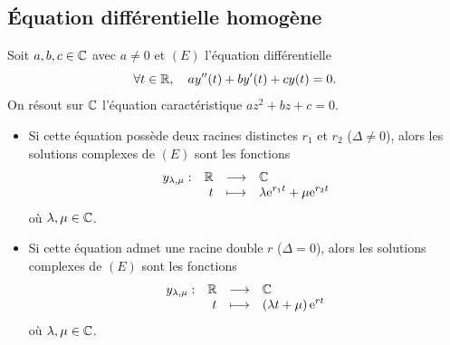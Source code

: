 \documentclass{magnolia}
\begin{document}
\subsection{Équation différentielle homogène}

\begin{proposition}[utile=-3]
Soit $a,b,c\in\mathbb{C}$ avec $a\neq 0$ et $(E)$ l'équation différentielle
\[\forall t\in\mathbb{R} ,\quad a y''(t)+by'(t)+cy(t)=0.\]
On résout sur $\mathbb{C}$ l'équation caractéristique $az^2+bz+c=0$.
\begin{itemize}
\item Si cette équation possède deux racines distinctes $r_1$ et $r_2$
  ($\Delta\neq 0$), alors les solutions complexes de $(E)$ sont les fonctions
  \[\begin{array}[t]{lrcl} \displaystyle{y_{\lambda,\mu}} : & \displaystyle{\mathbb{R}} & \longrightarrow & \displaystyle{\mathbb{C}} \\ & \displaystyle{t} & \longmapsto & \displaystyle{\lambda {\rm e}^{r_1 t}+\mu {\rm e}^{r_2 t}} \end{array}\]
  où $\lambda,\mu\in\mathbb{C}$.
\item Si cette équation admet une racine double $r$ ($\Delta=0$), alors les
  solutions complexes de $(E)$ sont les fonctions
  \[\begin{array}[t]{lrcl} \displaystyle{y_{\lambda,\mu}} : & \displaystyle{\mathbb{R}} & \longrightarrow & \displaystyle{\mathbb{C}} \\ & \displaystyle{t} & \longmapsto & \displaystyle{\left(\lambda t+\mu\right){\rm e}^{r t}} \end{array}\]
  où $\lambda,\mu\in\mathbb{C}$.
\end{itemize}
\end{proposition}
\end{document}
